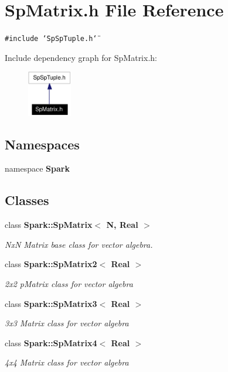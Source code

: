 \section{Sp\-Matrix.h File Reference}
\label{SpMatrix_8h}
{\tt \#include \char`\"{}Sp\-Sp\-Tuple.h\char`\"{}}\par


Include dependency graph for Sp\-Matrix.h:\begin{figure}[H]
\begin{center}
\leavevmode
\includegraphics[width=55pt]{SpMatrix_8h__incl}
\end{center}
\end{figure}
\subsection*{Namespaces}
\begin{CompactItemize}
\item 
namespace {\bf Spark}
\end{CompactItemize}
\subsection*{Classes}
\begin{CompactItemize}
\item 
class {\bf Spark::Sp\-Matrix$<$ N, Real $>$}
\begin{CompactList}\small\item\em Nx\-N Matrix base class for vector algebra. \item\end{CompactList}\item 
class {\bf Spark::Sp\-Matrix2$<$ Real $>$}
\begin{CompactList}\small\item\em 2x2 p\-Matrix class for vector algebra \item\end{CompactList}\item 
class {\bf Spark::Sp\-Matrix3$<$ Real $>$}
\begin{CompactList}\small\item\em 3x3 Matrix class for vector algebra \item\end{CompactList}\item 
class {\bf Spark::Sp\-Matrix4$<$ Real $>$}
\begin{CompactList}\small\item\em 4x4 Matrix class for vector algebra \item\end{CompactList}\end{CompactItemize}
